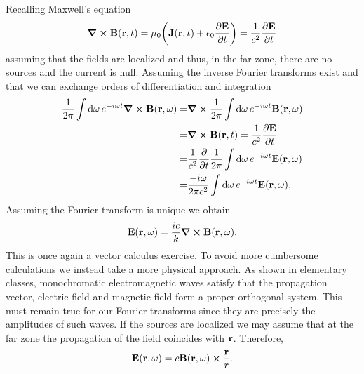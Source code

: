 \documentclass{article}
\begin{document}
\begin{enumerate}[(i)]
Recalling Maxwell's equation
\begin{equation}
\curl{\vb{B}}(\vb{r},t)=\mu_0\qty(\vb{J}(\vb{r},t)+\epsilon_0\pdv{\vb{E}}{t}(\vb{r},t))=\frac{1}{c^2}\pdv{\vb{E}}{t}(\vb{r},t)
\end{equation}
assuming that the fields are localized and thus, in the far zone, there are no sources and the current is null. Assuming the inverse Fourier transforms exist and that we can exchange orders of differentiation and integration
\begin{align}
\begin{split}
\frac{1}{2\pi}\int\dd{\omega}e^{-i\omega t}\curl{\vb{B}}(\vb{r},\omega)=&\curl\frac{1}{2\pi}\int\dd{\omega}e^{-i\omega t}\vb{B}(\vb{r},\omega)\\
=&\curl{\vb{B}}(\vb{r},t)=\frac{1}{c^2}\pdv{\vb{E}}{t}(\vb{r},t)\\
=&\frac{1}{c^2}\pdv{t}\frac{1}{2\pi}\int\dd{\omega}e^{-i\omega t}\vb{E}(\vb{r},\omega)\\
=&\frac{-i\omega}{2\pi c^2}\int\dd{\omega}e^{-i\omega t}\vb{E}(\vb{r},\omega).
\end{split}
\end{align}
Assuming the Fourier transform is unique we obtain
\begin{equation}
\vb{E}(\vb{r},\omega)=\frac{ic}{k}\curl{\vb{B}}(\vb{r},\omega).
\end{equation}
This is once again a vector calculus exercise. To avoid more cumbersome calculations we instead take a more physical approach. As shown in elementary classes, monochromatic electromagnetic waves satisfy that the propagation vector, electric field and magnetic field form a proper orthogonal system. This must remain true for our Fourier transforms since they are precisely the amplitudes of such waves. If the sources are localized we may assume that at the far zone the propagation of the field coincides with $\vb{r}$. Therefore,
\begin{align}
\begin{split}
\vb{E}(\vb{r},\omega)=c\vb{B}(\vb{r},\omega)\cross\frac{\vb{r}}{r}.
\end{split}
\end{align}

\end{enumerate}
\end{document}
